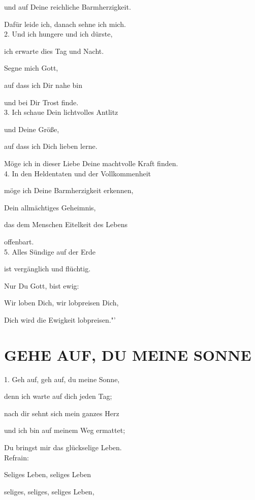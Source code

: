 \documentclass[11pt,a5paper,twoside]{article}
\begin{document}
und auf Deine reichliche Barmherzigkeit. 

Dafür leide ich, danach sehne ich mich.\\


2.  Und ich hungere und ich dürste, 

ich erwarte dies Tag und Nacht. 

Segne mich Gott, 

auf dass ich Dir nahe bin 

und bei Dir Trost finde.\\


3.  Ich schaue Dein lichtvolles Antlitz 

und Deine Größe,

auf dass ich Dich lieben lerne. 

Möge ich in dieser Liebe Deine machtvolle Kraft finden.\\


4.  In den Heldentaten und der Vollkommenheit 

möge ich Deine Barmherzigkeit erkennen,

Dein allmächtiges Geheimnis,

das dem Menschen Eitelkeit des Lebens

offenbart. \\


5. Alles Sündige auf der Erde

ist vergänglich und flüchtig.

Nur Du Gott, bist ewig:

Wir loben Dich, wir lobpreisen Dich,

Dich wird die Ewigkeit lobpreisen."' 



\section[Gehe auf, du meine Sonne]{GEHE AUF, DU MEINE SONNE}

1. Geh auf, geh auf, du meine Sonne, 

denn ich warte auf dich jeden Tag; 

nach dir sehnt sich mein ganzes Herz

und ich bin auf meinem Weg ermattet;
 
Du bringst mir das glückselige Leben.\\

Refrain:

Seliges Leben, seliges Leben

seliges, seliges, seliges Leben,
\end{document}
